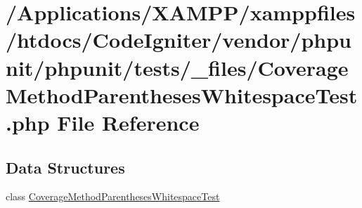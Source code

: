 \hypertarget{phpunit_2tests_2__files_2_coverage_method_parentheses_whitespace_test_8php}{}\section{/\+Applications/\+X\+A\+M\+P\+P/xamppfiles/htdocs/\+Code\+Igniter/vendor/phpunit/phpunit/tests/\+\_\+files/\+Coverage\+Method\+Parentheses\+Whitespace\+Test.php File Reference}
\label{phpunit_2tests_2__files_2_coverage_method_parentheses_whitespace_test_8php}
\subsection*{Data Structures}
\begin{DoxyCompactItemize}
\item 
class \mbox{\hyperlink{class_coverage_method_parentheses_whitespace_test}{Coverage\+Method\+Parentheses\+Whitespace\+Test}}
\end{DoxyCompactItemize}
